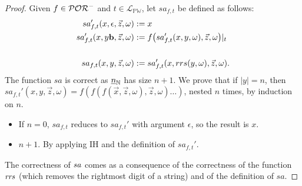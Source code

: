 






\saPOR*

\begin{proof}
  \label{proof:saPOR}
Given $f\in \mathcal{POR}^-$ and $t\in \mathcal{L}_{\mathbb{PW}}$,
let $sa_{f,t}$ be defined as follows:
\begin{align*}
sa_{f,t}' (x,\epsilon, \vec{z}, \omega) &:= x \\
sa_{f,t}' (x,y\mathbf{b}, \vec{z}, \omega) &:= f\big(sa_{f,t}'(x,y,\omega),
\vec{z},\omega\big)|_{t} \\
\\
sa_{f,t}(x,y,\vec{z},\omega) &:= sa_{f,t}'(x, rrs(y,\omega),\vec{z},\omega).
\end{align*}
{The function $sa$
is correct as $\underline{n}_{\mathbb{N}}$
has size $n+1$.}
%
We prove that if $|y| = n$,
then $sa_{f,t}'(x,y,\vec{z},\omega)=
f(f(f(\vec{x},\vec{z},\omega), \vec{z},\omega)\dots)$,
nested $n$ times,
by induction on $n$.
\begin{itemize}
  \item If $n=0$, $sa_{f,t}$ reduces to $sa_{f,t}'$ with argument $\epsilon$,
  so the result is $x$.
\item $n+1.$ By applying IH and the definition of $sa_{f,t}'$. \\
\end{itemize}

The correctness of $\mathit{sa}$ comes as a consequence of the correctness
of the function $\mathit{rrs}$ (which removes the rightmost digit of a string)
and of the definition of $sa$.


\end{proof}

